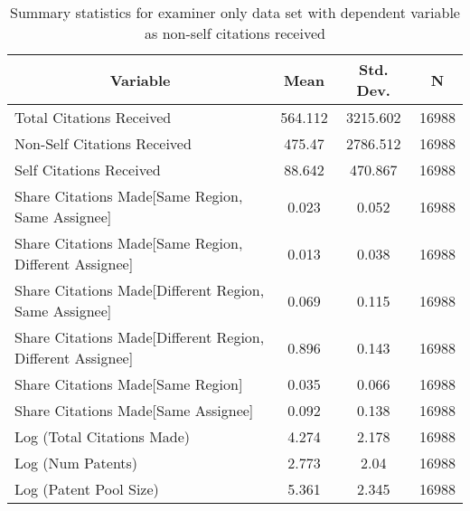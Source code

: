 
\begin{table}[htbp]\centering \caption{Summary statistics for examiner only data set with dependent variable as non-self citations received  \label{e.nsummary}}
\begin{tabular}{l c c  c}\hline\hline
\multicolumn{1}{c}{\textbf{Variable}} & \textbf{Mean}
 & \textbf{Std. Dev.} & \textbf{N}\\ \hline
Total Citations Received & 564.112 & 3215.602  & 16988\\
Non-Self Citations Received & 475.47 & 2786.512  & 16988\\
Self Citations Received & 88.642 & 470.867  & 16988\\
Share Citations Made[Same Region, Same Assignee] & 0.023 & 0.052  & 16988\\
Share Citations Made[Same Region, Different Assignee] & 0.013 & 0.038  & 16988\\
Share Citations Made[Different Region, Same Assignee] & 0.069 & 0.115  & 16988\\
Share Citations Made[Different Region, Different Assignee] & 0.896 & 0.143  & 16988\\
Share Citations Made[Same Region] & 0.035 & 0.066  & 16988\\
Share Citations Made[Same Assignee] & 0.092 & 0.138  & 16988\\
Log (Total Citations Made) & 4.274 & 2.178  & 16988\\
Log (Num Patents) & 2.773 & 2.04  & 16988\\
Log (Patent Pool Size) & 5.361 & 2.345  & 16988\\
\hline\end{tabular}
\end{table}
